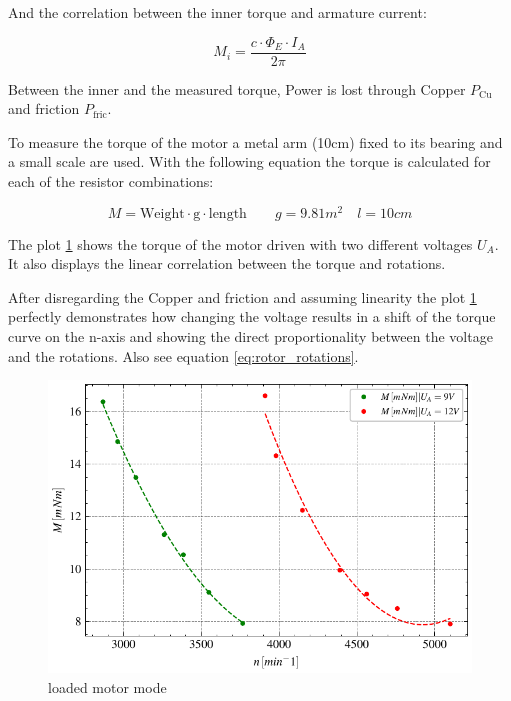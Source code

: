 \documentclass[conference]{IEEEtran}
\begin{document}
And the correlation between the inner torque and armature current:

\begin{equation} \label{eq:inner_tourque}
    M_i = \frac{c \cdot \Phi_E \cdot I_A}{2 \pi}
\end{equation}


Between the inner and the measured torque, Power is lost through Copper
$P_\mathrm{Cu}$ and friction $ P_\text{fric}$.

To measure the torque of the motor a metal arm (10cm) fixed to its bearing and
a small scale are used. With the following equation the torque is calculated
for each of the resistor combinations:

\begin{equation}
    M = \text{Weight} \cdot \mathrm{g} \cdot \text{length} \qquad g=9.81
    \si{m}^2 \quad l=10 \si{cm}
    \label{eq:tourqe_weight_length}
\end{equation}






The plot \ref{fig:loaded_motor_mode} shows the torque of the motor driven with
two different voltages $U_A$. It also displays the linear correlation between the
torque and rotations.

After disregarding the Copper and friction and assuming linearity the plot
\ref{fig:loaded_motor_mode} perfectly demonstrates how changing the voltage
results in a shift of the torque curve on the n-axis and showing the direct
proportionality between the voltage and the rotations. Also see equation
\ref{eq:rotor_rotations}.

\begin{figure}[htbp]
    \centering
    \includegraphics[width=\columnwidth]{plots/4.3_Belasteter_Motor_UA9V_12V.pdf}
    \caption{loaded motor mode}
    \label{fig:loaded_motor_mode}
\end{figure}
\end{document}
